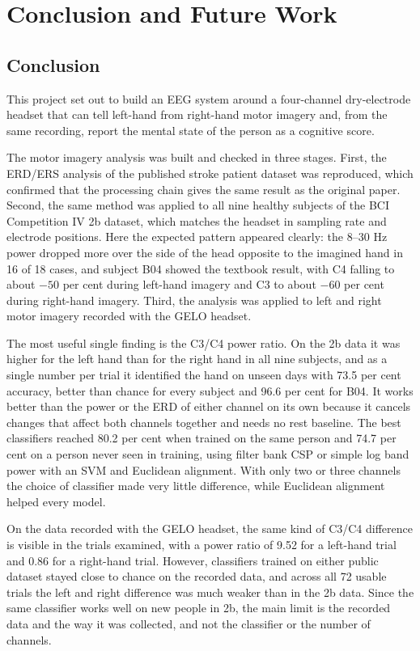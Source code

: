 \chapter{Conclusion and Future Work}

\section{Conclusion}

This project set out to build an EEG system around a four-channel dry-electrode headset
that can tell left-hand from right-hand motor imagery and, from the same recording,
report the mental state of the person as a cognitive score.

The motor imagery analysis was built and checked in three stages. First, the ERD/ERS
analysis of the published stroke patient dataset was reproduced, which confirmed that the
processing chain gives the same result as the original paper. Second, the same method was
applied to all nine healthy subjects of the BCI Competition IV 2b dataset, which matches
the headset in sampling rate and electrode positions. Here the expected pattern appeared
clearly: the 8--30 Hz power dropped more over the side of the head opposite to the
imagined hand in 16 of 18 cases, and subject B04 showed the textbook result, with C4
falling to about $-50$ per cent during left-hand imagery and C3 to about $-60$ per cent
during right-hand imagery. Third, the analysis was applied to left and right motor imagery
recorded with the GELO headset.

The most useful single finding is the C3/C4 power ratio. On the 2b data it was higher for
the left hand than for the right hand in all nine subjects, and as a single number per
trial it identified the hand on unseen days with 73.5 per cent accuracy, better than chance
for every subject and 96.6 per cent for B04. It works better than the power or the ERD of
either channel on its own because it cancels changes that affect both channels together
and needs no rest baseline. The best classifiers reached 80.2 per cent when trained on the
same person and 74.7 per cent on a person never seen in training, using filter bank CSP or
simple log band power with an SVM and Euclidean alignment. With only two or three channels
the choice of classifier made very little difference, while Euclidean alignment helped
every model.

On the data recorded with the GELO headset, the same kind of C3/C4 difference is visible in
the trials examined, with a power ratio of 9.52 for a left-hand trial and 0.86 for a
right-hand trial. However, classifiers trained on either public dataset stayed close to
chance on the recorded data, and across all 72 usable trials the left and right difference
was much weaker than in the 2b data. Since the same classifier works well on new people in
2b, the main limit is the recorded data and the way it was collected, and not the
classifier or the number of channels.


